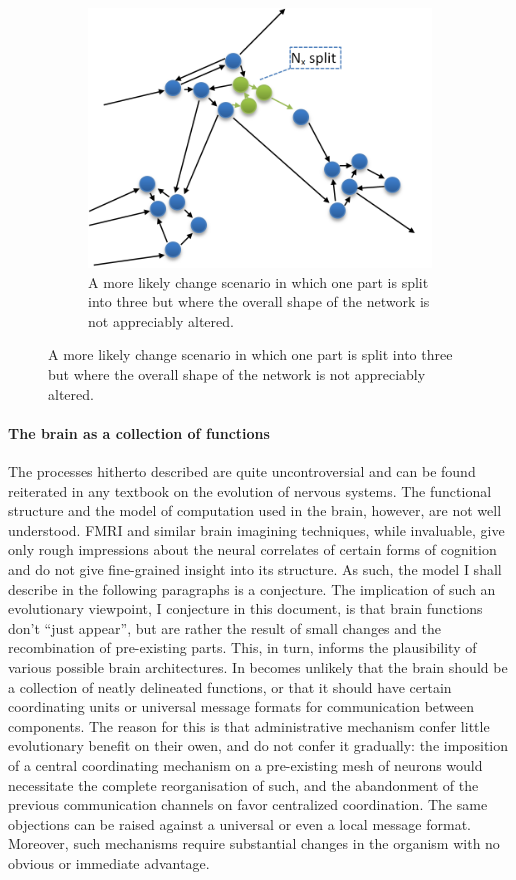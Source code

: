 \begin{figure}
\begin{subfigure}[t]{0.45\textwidth}
		\includegraphics[width=\textwidth]{figs/likelyEvolution.png}
		\caption{A more likely change scenario in which one part is split into three but where the overall shape of the network is not appreciably altered.}
		\label{fig:likelyEvolution}
	\end{subfigure}
\end{figure}

\paragraph{The brain as a collection of functions}

The processes hitherto described are quite uncontroversial and can be found reiterated in any textbook on the evolution of nervous systems. The functional structure and the model of computation used in the brain, however, are not well understood. FMRI and similar brain imagining techniques, while invaluable, give only rough impressions about the neural correlates of certain forms of cognition and do not give fine-grained insight into its structure. As such, the model I shall describe in the following paragraphs is a conjecture. The implication of such an evolutionary viewpoint, I conjecture in this document, is that brain functions don't ``just appear'', but are rather the result of small changes and the recombination of pre-existing parts. This, in turn, informs the plausibility of various possible brain architectures. In becomes unlikely that the brain should be a collection of neatly delineated functions, or that it should have certain coordinating units or universal message formats for communication between components. The reason for this is that administrative mechanism confer little evolutionary benefit on their owen, and do not confer it gradually: the imposition of a central coordinating mechanism on a pre-existing mesh of neurons would necessitate the complete reorganisation of such, and the abandonment of the previous communication channels on favor centralized coordination. The same objections can be raised against a universal or even a local message format. Moreover, such mechanisms require substantial changes in the organism with no obvious or immediate advantage.

